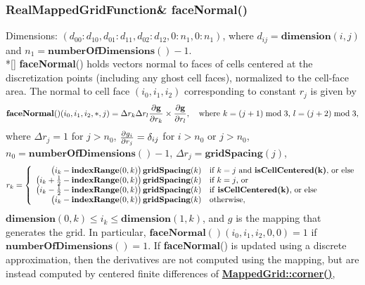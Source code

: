 \documentclass{article}
\begin{document}
  \subsubsection{RealMappedGridFunction\& faceNormal()}
  \label{MappedGrid::faceNormal()}
    Dimensions: $(d_{00}\colon d_{10},d_{01}\colon d_{11},d_{02}\colon d_{12},0\colon n_1,0\colon n_1)$,
    where $d_{ij} = \textbf{dimension}(i,j)$ and $n_1 = \textbf{numberOfDimensions}() - 1$. \\*[\parskip]
    \textbf{faceNormal}() holds vectors normal to faces of cells centered at the discretization points (including any ghost cell faces),
    normalized to the cell-face area.
    The normal to cell face $(i_0,i_1,i_2)$ corresponding to constant $r_j$ is given by
    \[
      \textbf{faceNormal}()(i_0,i_1,i_2,\ast,j) = \Delta r_k \Delta r_l
      {\partial \textbf{g} \over \partial r_k} \times {\partial \textbf{g} \over \partial r_l},
      \quad\mbox{where $k=(j+1)\bmod3$, $l=(j+2)\bmod3$},
    \]
    where $\Delta r_j=1$ for $j>n_0$, ${\partial g_i \over \partial r_j} = \delta_{ij}$
    for $i>n_0$ or $j>n_0$, $n_0=\textbf{numberOfDimensions}()-1$, $\Delta r_j = \textbf{gridSpacing}(j)$,
    \[
      r_k = \left\{ \begin{array}{rl}
        \big(i_k             - \textbf{indexRange}(0,k)\big)\,\textbf{gridSpacing}(k) & \mbox{if $k=j$ and \textbf{isCellCentered(k)}, or else} \\
        \big(i_k + {1\over2} - \textbf{indexRange}(0,k)\big)\,\textbf{gridSpacing}(k) & \mbox{if $k=j$, or}                                        \\
        \big(i_k - {1\over2} - \textbf{indexRange}(0,k)\big)\,\textbf{gridSpacing}(k) & \mbox{if \textbf{isCellCentered(k)}, or else}           \\
        \big(i_k             - \textbf{indexRange}(0,k)\big)\,\textbf{gridSpacing}(k) & \mbox{otherwise},                                          \\
      \end{array} \right.
    \]
    $\textbf{dimension}(0,k) \le i_k \le \textbf{dimension}(1,k)$, and {\boldmath $g$} is the mapping that generates the grid.
    In particular, $\textbf{faceNormal}()(i_0,i_1,i_2,0,0)=1$ if $\textbf{numberOfDimensions}()=1$.
    If \textbf{faceNormal}() is updated using a discrete approximation, then the derivatives are not computed using the mapping,
    but are instead computed by centered finite differences of {\bf{}\hyperref{corner()}{corner() \rm(\S}{)}{MappedGrid::corner()}},
\end{document}
